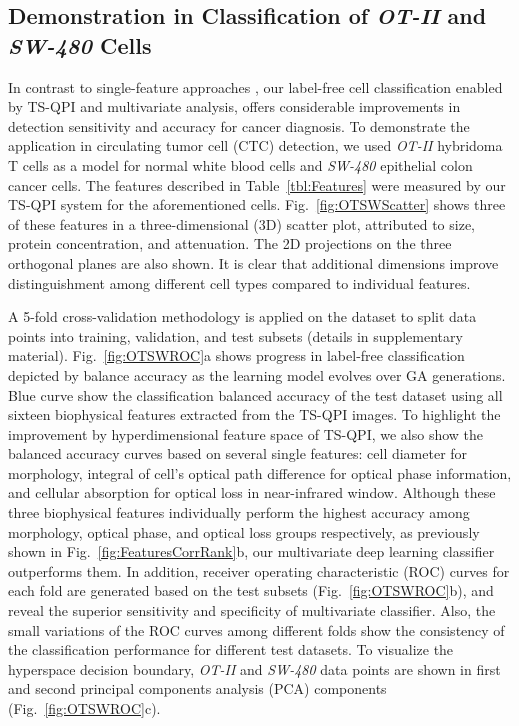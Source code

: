\documentclass[aps,pra,reprint,superscriptaddress]{revtex4-1}
\begin{document}
\subsection*{Demonstration in Classification of \textit{OT-II} and \textit{SW-480} Cells}

In contrast to single-feature approaches \cite{nagrath2007isolation, vona2000isolation, kling2012beyond}, our label-free cell classification enabled by TS-QPI and multivariate analysis, offers considerable improvements in detection sensitivity and accuracy for cancer diagnosis. To demonstrate the application in circulating tumor cell (CTC) detection, we used \textit{OT-II} hybridoma T cells as a model for normal white blood cells and \textit{SW-480} epithelial colon cancer cells. The features described in Table~\ref{tbl:Features} were measured by our TS-QPI system for the aforementioned cells. Fig.~\ref{fig:OTSWScatter} shows three of these features in a three-dimensional (3D) scatter plot, attributed to size, protein concentration, and attenuation. The 2D projections on the three orthogonal planes are also shown. It is clear that additional dimensions improve distinguishment among different cell types compared to individual features.

A 5-fold cross-validation methodology is applied on the dataset to split data points into training, validation, and test subsets (details in supplementary material). Fig.~\ref{fig:OTSWROC}a shows progress in label-free classification depicted by balance accuracy as the learning model evolves over GA generations. Blue curve show the classification balanced accuracy of the test dataset using all sixteen biophysical features extracted from the TS-QPI images. To highlight the improvement by hyperdimensional feature space of TS-QPI, we also show the balanced accuracy curves based on several single features: cell diameter for morphology, integral of cell's optical path difference for optical phase information, and cellular absorption for optical loss in near-infrared window. Although these three biophysical features individually perform the highest accuracy among morphology, optical phase, and optical loss groups respectively, as previously shown in Fig.~\ref{fig:FeaturesCorrRank}b, our multivariate deep learning classifier outperforms them. In addition, receiver operating characteristic (ROC) curves for each fold are generated based on the test subsets (Fig.~\ref{fig:OTSWROC}b), and reveal the superior sensitivity and specificity of multivariate classifier. Also, the small variations of the ROC curves among different folds show the consistency of the classification performance for different test datasets. To visualize the hyperspace decision boundary, \textit{OT-II} and \textit{SW-480} data points are shown in first and second principal components analysis (PCA) components (Fig.~\ref{fig:OTSWROC}c).
\end{document}
